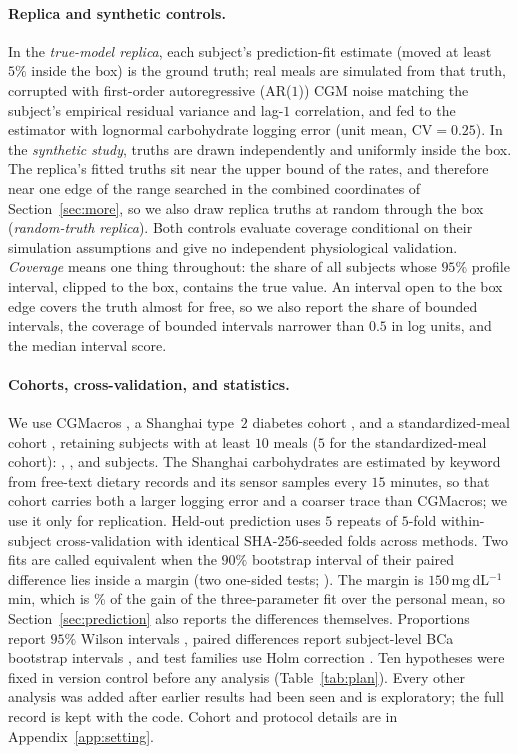\paragraph{Replica and synthetic controls.}
In the \emph{true-model replica}, each subject's prediction-fit estimate (moved at least $5\%$ inside the box) is the ground truth; real meals are simulated from that truth, corrupted with first-order autoregressive (AR($1$)) CGM noise matching the subject's empirical residual variance and lag-$1$ correlation, and fed to the estimator with lognormal carbohydrate logging error (unit mean, $\mathrm{CV}=0.25$).
In the \emph{synthetic study}, truths are drawn independently and uniformly inside the box.
The replica's fitted truths sit near the upper bound of the rates, and therefore near one edge of the range searched in the combined coordinates of Section~\ref{sec:more}, so we also draw replica truths at random through the box (\emph{random-truth replica}).
Both controls evaluate coverage conditional on their simulation assumptions and give no independent physiological validation.
\emph{Coverage} means one thing throughout: the share of all subjects whose $95\%$ profile interval, clipped to the box, contains the true value.
An interval open to the box edge covers the truth almost for free, so we also report the share of bounded intervals, the coverage of bounded intervals narrower than $0.5$ in log units, and the median interval score.

\paragraph{Cohorts, cross-validation, and statistics.}
We use CGMacros \citep{das2025cgmacros}, a Shanghai type~$2$ diabetes cohort \citep{zhao2023shanghai}, and a standardized-meal cohort \citep{hall2018glucotypes}, retaining subjects with at least $10$ meals ($5$ for the standardized-meal cohort): \resCohortCgmSubjects, \resCohortShanghaiSubjects, and \resCohortHallSubjects{} subjects.
The Shanghai carbohydrates are estimated by keyword from free-text dietary records and its sensor samples every $15$ minutes, so that cohort carries both a larger logging error and a coarser trace than CGMacros; we use it only for replication.
Held-out prediction uses $5$ repeats of $5$-fold within-subject cross-validation with identical SHA-256-seeded folds across methods.
Two fits are called equivalent when the $90\%$ bootstrap interval of their paired difference lies inside a margin (two one-sided tests; \citealp{schuirmann1987comparison}). The margin is $150$\,mg\,dL$^{-1}$\,min, which is \resMarginShareGain\% of the gain of the three-parameter fit over the personal mean, so Section~\ref{sec:prediction} also reports the differences themselves.
Proportions report $95\%$ Wilson intervals \citep{wilson1927probable}, paired differences report subject-level BCa bootstrap intervals \citep{efron1987better}, and test families use Holm correction \citep{holm1979simple}.
Ten hypotheses were fixed in version control before any analysis (Table~\ref{tab:plan}). Every other analysis was added after earlier results had been seen and is exploratory; the full record is kept with the code. Cohort and protocol details are in Appendix~\ref{app:setting}.


